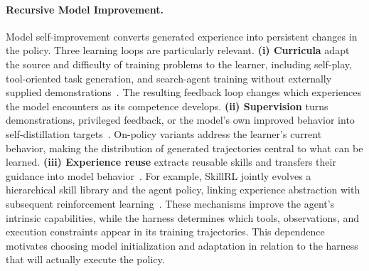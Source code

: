 \documentclass[11pt,a4paper]{article}
\begin{document}
\paragraph{Recursive Model Improvement.}
Model self-improvement converts generated experience into persistent changes in the policy. Three learning loops are particularly relevant. \textbf{(i) Curricula} adapt the source and difficulty of training problems to the learner, including self-play, tool-oriented task generation, and search-agent training without externally supplied demonstrations~\citep{zhao2025absolutezero,acikgoz2026toolr0,sundaram2026soar,yang2026ttcs,yang2026coevolve,yue2026drzero}. The resulting feedback loop changes which experiences the model encounters as its competence develops. \textbf{(ii) Supervision} turns demonstrations, privileged feedback, or the model's own improved behavior into self-distillation targets~\citep{zhao2026opsd,shenfeld2026sdft,hubotter2026sdpo,zhang2026lopd,lu2026sdar}. On-policy variants address the learner's current behavior, making the distribution of generated trajectories central to what can be learned. \textbf{(iii) Experience reuse} extracts reusable skills and transfers their guidance into model behavior~\citep{xia2026skillrl,zhang2026opdevolver,lu2026skill0,wu2026seed,yang2026opid}. For example, SkillRL jointly evolves a hierarchical skill library and the agent policy, linking experience abstraction with subsequent reinforcement learning~\citep{xia2026skillrl}. These mechanisms improve the agent's intrinsic capabilities, while the harness determines which tools, observations, and execution constraints appear in its training trajectories. This dependence motivates choosing model initialization and adaptation in relation to the harness that will actually execute the policy.
\end{document}
